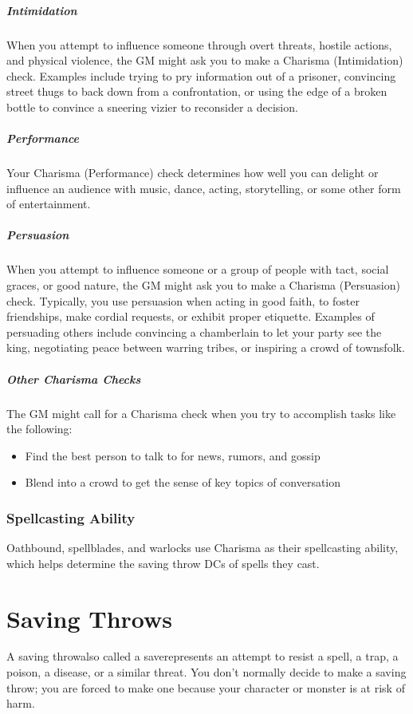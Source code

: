 \subparagraph*{Intimidation} When you attempt to influence someone through overt threats, hostile actions, and physical violence, the GM might ask you to make a Charisma (Intimidation) check. Examples include trying to pry information out of a prisoner, convincing street thugs to back down from a confrontation, or using the edge of a broken bottle to convince a sneering vizier to reconsider a decision.

\subparagraph*{Performance} Your Charisma (Performance) check determines how well you can delight or influence an audience with music, dance, acting, storytelling, or some other form of entertainment.

\subparagraph*{Persuasion} When you attempt to influence someone or a group of people with tact, social graces, or good nature, the GM might ask you to make a Charisma (Persuasion) check. Typically, you use persuasion when acting in good faith, to foster friendships, make cordial requests, or exhibit proper etiquette. Examples of persuading others include convincing a chamberlain to let your party see the king, negotiating peace between warring tribes, or inspiring a crowd of townsfolk.

\subparagraph*{Other Charisma Checks} The GM might call for a Charisma check when you try to accomplish tasks like the following:

\begin{itemize}
    \item Find the best person to talk to for news, rumors, and gossip
    \item Blend into a crowd to get the sense of key topics of conversation
\end{itemize}

\subsubsection{Spellcasting Ability}

Oathbound, spellblades, and warlocks use Charisma as their spellcasting ability, which helps determine the saving throw DCs of spells they cast.

\section{Saving Throws}
A saving throw\textemdash also called a save\textemdash represents an attempt to resist a spell, a trap, a poison, a disease, or a similar threat. You don't normally decide to make a saving throw; you are forced to make one because your character or monster is at risk of harm.

